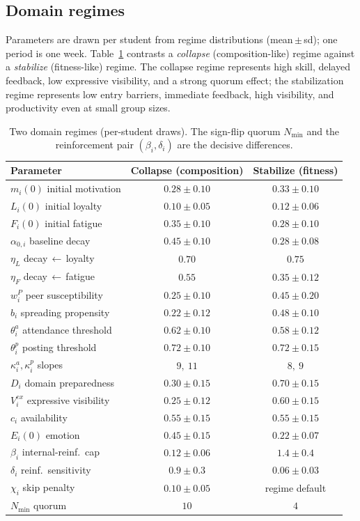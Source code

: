 \documentclass[11pt]{article}
\begin{document}
\subsection{Domain regimes}\label{sec:regimes}
Parameters are drawn per student from regime distributions (mean\,$\pm$\,sd); one period is one week. Table~\ref{tab:regimes} contrasts a \emph{collapse} (composition-like) regime against a \emph{stabilize} (fitness-like) regime. The collapse regime represents high skill, delayed feedback, low expressive visibility, and a strong quorum effect; the stabilization regime represents low entry barriers, immediate feedback, high visibility, and productivity even at small group sizes.

\begin{table}[t]
\centering\small
\setlength{\tabcolsep}{8pt}
\renewcommand{\arraystretch}{1.12}
\begin{tabular}{@{}lcc@{}}
\toprule
Parameter & Collapse (composition) & Stabilize (fitness)\\
\midrule
$m_i(0)$ initial motivation & $0.28\pm0.10$ & $0.33\pm0.10$\\
$L_i(0)$ initial loyalty & $0.10\pm0.05$ & $0.12\pm0.06$\\
$F_i(0)$ initial fatigue & $0.35\pm0.10$ & $0.28\pm0.10$\\
$\alpha_{0,i}$ baseline decay & $0.45\pm0.10$ & $0.28\pm0.08$\\
$\eta_L$ decay\,$\leftarrow$\,loyalty & $0.70$ & $0.75$\\
$\eta_F$ decay\,$\leftarrow$\,fatigue & $0.55$ & $0.35\pm0.12$\\
$w^{P}_i$ peer susceptibility & $0.25\pm0.10$ & $0.45\pm0.20$\\
$b_i$ spreading propensity & $0.22\pm0.12$ & $0.48\pm0.10$\\
$\theta^a_i$ attendance threshold & $0.62\pm0.10$ & $0.58\pm0.12$\\
$\theta^p_i$ posting threshold & $0.72\pm0.10$ & $0.72\pm0.15$\\
$\kappa^a_i,\kappa^p_i$ slopes & $9,\ 11$ & $8,\ 9$\\
$D_i$ domain preparedness & $0.30\pm0.15$ & $0.70\pm0.15$\\
$V^{ex}_i$ expressive visibility & $0.25\pm0.12$ & $0.60\pm0.15$\\
$c_i$ availability & $0.55\pm0.15$ & $0.55\pm0.15$\\
$E_i(0)$ emotion & $0.45\pm0.15$ & $0.22\pm0.07$\\
$\beta_i$ internal-reinf.\ cap & $0.12\pm0.06$ & $1.4\pm0.4$\\
$\delta_i$ reinf.\ sensitivity & $0.9\pm0.3$ & $0.06\pm0.03$\\
$\chi_i$ skip penalty & $0.10\pm0.05$ & regime default\\
$N_{\min}$ quorum & $10$ & $4$\\
\bottomrule
\end{tabular}
\caption{Two domain regimes (per-student draws). The sign-flip quorum $N_{\min}$ and the reinforcement pair $(\beta_i,\delta_i)$ are the decisive differences.}
\label{tab:regimes}
\end{table}
\end{document}
